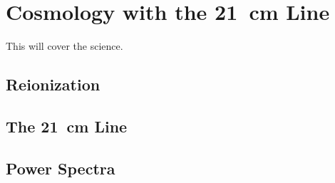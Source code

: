 \chapter{Cosmology with the 21\ cm Line}
\label{ch1}

This will cover the science.

\section{Reionization}

\section{The 21\ cm Line}

\section{Power Spectra}
